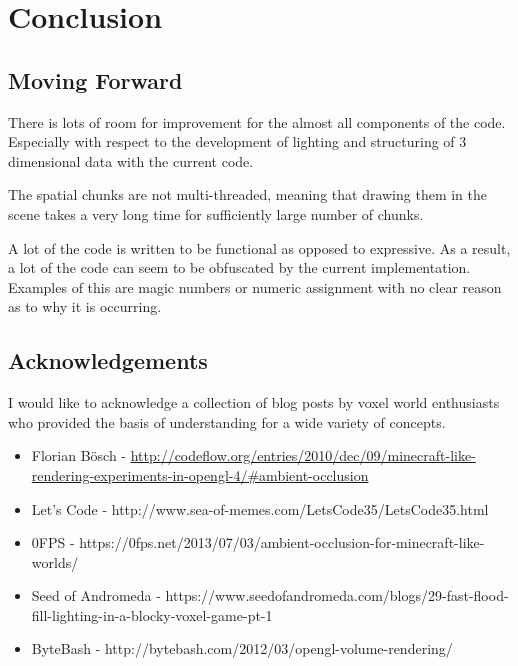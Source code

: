 \documentclass{book}
\begin{document}
\chapter{Conclusion}
\section{Moving Forward}
There is lots of room for improvement for the almost all components of the code.  Especially with respect to the development of lighting and structuring of 3 dimensional data with the current code.

The spatial chunks are not multi-threaded, meaning that drawing them in the scene takes a very long time for sufficiently large number of chunks.
      
A lot of the code is written to be functional as opposed to expressive.  As a result, a lot of the code can seem to be obfuscated by the current implementation.  Examples of this are magic numbers or numeric assignment with no clear reason as to why it is occurring.  

\section{Acknowledgements}
I would like to acknowledge a collection of blog posts by voxel world enthusiasts who provided the basis of understanding for a wide variety of concepts.

\begin{itemize}
	\item Florian Bösch - \url{http://codeflow.org/entries/2010/dec/09/minecraft-like-rendering-experiments-in-opengl-4/#ambient-occlusion}
	\item Let's Code - http://www.sea-of-memes.com/LetsCode35/LetsCode35.html
	\item 0FPS - https://0fps.net/2013/07/03/ambient-occlusion-for-minecraft-like-worlds/
	\item Seed of Andromeda - https://www.seedofandromeda.com/blogs/29-fast-flood-fill-lighting-in-a-blocky-voxel-game-pt-1
	\item ByteBash - http://bytebash.com/2012/03/opengl-volume-rendering/
\end{itemize}

\end{document}
